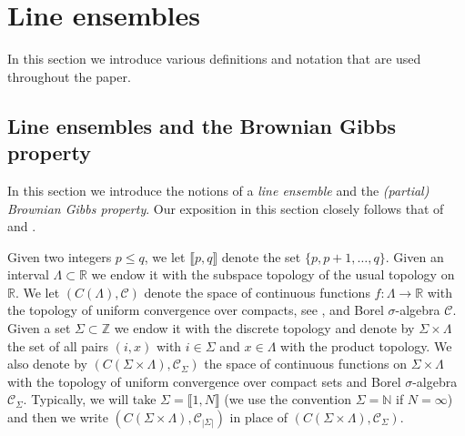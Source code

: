 %
\section{Line ensembles} \label{Section2}
In this section we introduce various definitions and notation that are used throughout the paper. 

%
\subsection{Line ensembles and the Brownian Gibbs property}\label{Section2.1}
In this section we introduce the notions of a {\em line ensemble} and the {\em (partial) Brownian Gibbs property}. Our exposition in this section closely follows that of \cite[Section 2]{DimMat} and \cite[Section 2]{CorHamA}. 

Given two integers $p \leq q$, we let $\llbracket p, q \rrbracket$ denote the set $\{p, p+1, \dots, q\}$. Given an interval $\Lambda \subset \mathbb{R}$ we endow it with the subspace topology of the usual topology on $\mathbb{R}$. We let $(C(\Lambda), \mathcal{C})$ denote the space of continuous functions $f: \Lambda \rightarrow \mathbb{R}$ with the topology of uniform convergence over compacts, see \cite[Chapter 7, Section 46]{Munkres}, and Borel $\sigma$-algebra $\mathcal{C}$. Given a set $\Sigma \subset \mathbb{Z}$ we endow it with the discrete topology and denote by $\Sigma \times \Lambda$ the set of all pairs $(i,x)$ with $i \in \Sigma$ and $x \in \Lambda$ with the product topology. We also denote by $\left(C (\Sigma \times \Lambda), \mathcal{C}_{\Sigma}\right)$ the space of continuous functions on $\Sigma \times \Lambda$ with the topology of uniform convergence over compact sets and Borel $\sigma$-algebra $\mathcal{C}_{\Sigma}$. Typically, we will take $\Sigma = \llbracket 1, N \rrbracket$ (we use the convention $\Sigma = \mathbb{N}$ if $N = \infty$) and then we write  $\left(C (\Sigma \times \Lambda), \mathcal{C}_{|\Sigma|}\right)$ in place of $\left(C (\Sigma \times \Lambda), \mathcal{C}_{\Sigma}\right)$.





